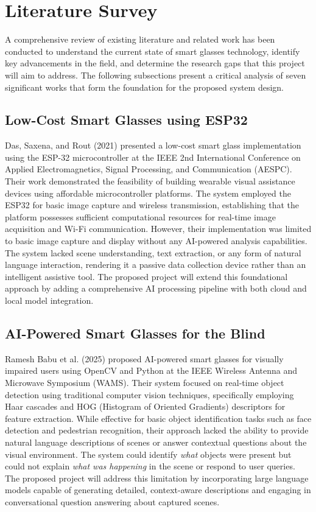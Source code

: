 \chapter{Literature Survey}

A comprehensive review of existing literature and related work has been conducted to understand the current state of smart glasses technology, identify key advancements in the field, and determine the research gaps that this project will aim to address. The following subsections present a critical analysis of seven significant works that form the foundation for the proposed system design.

\section{Low-Cost Smart Glasses using ESP32}
Das, Saxena, and Rout (2021) presented a low-cost smart glass implementation using the ESP-32 microcontroller at the IEEE 2nd International Conference on Applied Electromagnetics, Signal Processing, and Communication (AESPC). Their work demonstrated the feasibility of building wearable visual assistance devices using affordable microcontroller platforms. The system employed the ESP32 for basic image capture and wireless transmission, establishing that the platform possesses sufficient computational resources for real-time image acquisition and Wi-Fi communication. However, their implementation was limited to basic image capture and display without any AI-powered analysis capabilities. The system lacked scene understanding, text extraction, or any form of natural language interaction, rendering it a passive data collection device rather than an intelligent assistive tool. The proposed project will extend this foundational approach by adding a comprehensive AI processing pipeline with both cloud and local model integration.

\section{AI-Powered Smart Glasses for the Blind}
Ramesh Babu et al. (2025) proposed AI-powered smart glasses for visually impaired users using OpenCV and Python at the IEEE Wireless Antenna and Microwave Symposium (WAMS). Their system focused on real-time object detection using traditional computer vision techniques, specifically employing Haar cascades and HOG (Histogram of Oriented Gradients) descriptors for feature extraction. While effective for basic object identification tasks such as face detection and pedestrian recognition, their approach lacked the ability to provide natural language descriptions of scenes or answer contextual questions about the visual environment. The system could identify \textit{what} objects were present but could not explain \textit{what was happening} in the scene or respond to user queries. The proposed project will address this limitation by incorporating large language models capable of generating detailed, context-aware descriptions and engaging in conversational question answering about captured scenes.

